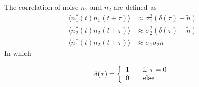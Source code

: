 \documentclass[draftcls]{IEEEtran}
\begin{document}
The correlation of noise $n_1$ and $n_2$ are defined as
\begin{equation}
\begin{split}
	\langle n_1^*(t)n_1(t +\tau)\rangle &\approx \sigma^2_1 (\delta(\tau) +\tilde{n})\\
    \langle n_2^*(t)n_2(t +\tau)\rangle &\approx \sigma^2_2 (\delta(\tau) +\tilde{n})\\
    \langle n_1^*(t)n_2(t +\tau)\rangle &\approx \sigma_1 \sigma_2 \tilde{n}
 \end{split}
\end{equation}
In which
	
\[ \delta(\tau) = \left\{ 
  \begin{array}{l l}
    1 & \quad \text{if $\tau=0$}\\
    0 & \quad \text{else}
  \end{array} \right.\]
\end{document}
